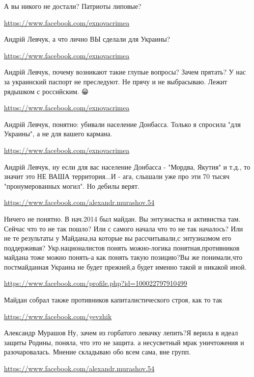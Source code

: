 \documentclass[a4paper,11pt]{extreport}
\begin{document}
\begin{itemize}
\begin{itemize}
А вы никого не достали? Патриоты липовые?

\url{https://www.facebook.com/exnovacrimea}

Андрій Левчук, а что лично ВЫ сделали для Украины?

\url{https://www.facebook.com/exnovacrimea}

Андрій Левчук, почему возникают такие глупые вопросы? Зачем прятать? У нас за украинский паспорт не преследуют. Не прячу и не выбрасываю. Лежит рядышком с российским. 😀

\url{https://www.facebook.com/exnovacrimea}

Андрій Левчук, понятно: убивали население Донбасса. Только я спросила "для Украины", а не для вашего кармана.

\url{https://www.facebook.com/exnovacrimea}

Андрій Левчук, ну если для вас население Донбасса - "Мордва, Якутия" и т.д., то значит это НЕ ВАША территория...И - ага, слышали уже про эти 70 тысяч "пронумерованных могил". Но дебилы верят.

\end{itemize}
\url{https://www.facebook.com/alexandr.murashov.54}

Ничего не понятно. В нач.2014 был майдан. Вы энтузиастка и активистка там. Сейчас что то не так пошло? Или с самого начала что то не так началось? Или не те результаты у Майдана,на которые вы рассчитывали,с энтузиазмом его поддерживая? Укр.националистов понять можно-логика понятная,противников майдана тоже можно понять-а как понять такую позицию?Вы же понимали,что постмайданная Украина не будет прежней,а будет именно такой и никакой иной.

\begin{itemize}
\url{https://www.facebook.com/profile.php?id=100022797910499}

Майдан собрал также противников капиталистического строя, как то так

\url{https://www.facebook.com/yevzhik}

Александр Мурашов Ну, зачем из горбатого левачку лепить?Я верила в идеал защиты Родины, поняла, что это не защита. а несусветный мрак уничтожения и разочаровалась. Мнение складываю обо всем сама, вне групп.

\url{https://www.facebook.com/alexandr.murashov.54}


\end{itemize}
\end{itemize}
\end{document}
